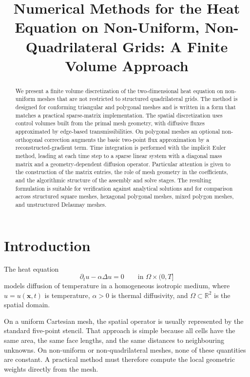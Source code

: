 \documentclass[11pt]{article}
\title{Numerical Methods for the Heat Equation on Non-Uniform, Non-Quadrilateral Grids: A Finite Volume Approach}
\author{}
\date{}
\theoremstyle{plain}
\theoremstyle{definition}
\theoremstyle{remark}
\numberwithin{equation}{section}
\begin{document}
\maketitle

\begin{abstract}
We present a finite volume discretization of the two-dimensional heat equation on non-uniform meshes that are not restricted to structured quadrilateral grids. The method is designed for conforming triangular and polygonal meshes and is written in a form that matches a practical sparse-matrix implementation. The spatial discretization uses control volumes built from the primal mesh geometry, with diffusive fluxes approximated by edge-based transmissibilities. On polygonal meshes an optional non-orthogonal correction augments the basic two-point flux approximation by a reconstructed-gradient term. Time integration is performed with the implicit Euler method, leading at each time step to a sparse linear system with a diagonal mass matrix and a geometry-dependent diffusion operator. Particular attention is given to the construction of the matrix entries, the role of mesh geometry in the coefficients, and the algorithmic structure of the assembly and solve stages. The resulting formulation is suitable for verification against analytical solutions and for comparison across structured square meshes, hexagonal polygonal meshes, mixed polygon meshes, and unstructured Delaunay meshes.
\end{abstract}

\section{Introduction}
The heat equation
\begin{equation}
\label{eq:heat_eq}
\partial_t u - \alpha \Delta u = 0
\qquad \text{in } \Omega \times (0,T]
\end{equation}
models diffusion of temperature in a homogeneous isotropic medium, where $u=u(\bm{x},t)$ is temperature, $\alpha>0$ is thermal diffusivity, and $\Omega \subset \mathbb{R}^2$ is the spatial domain.

On a uniform Cartesian mesh, the spatial operator is usually represented by the standard five-point stencil. That approach is simple because all cells have the same area, the same face lengths, and the same distances to neighbouring unknowns. On non-uniform or non-quadrilateral meshes, none of these quantities are constant. A practical method must therefore compute the local geometric weights directly from the mesh.
\end{document}

